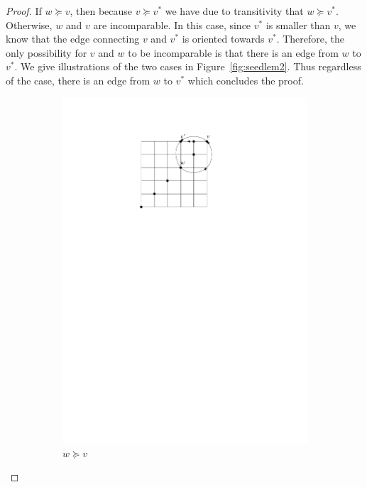 \documentclass[a4paper,10pt]{article}
\begin{document}
\begin{proof}
If $w \succeq v$, then because $v \succeq v^*$ we have due to transitivity that $w \succeq v^*$. 
  Otherwise, $w$ and $v$ are incomparable. In this case, since $v^*$ is smaller than $v$, we know that the edge connecting $v$ and $v^*$ is  oriented towards $v^*$. Therefore, the only possibility for $v$ and $w$ to be incomparable is that there is an edge from $w$ to $v^*$. We give illustrations of the two cases in Figure~\ref{fig:seedlem2}. Thus regardless of the case, there is an edge from $w$ to $v^*$ which concludes the proof.   
   \begin{figure}[htbp] 
       \centering
       \begin{subfigure}[b]{0.4\textwidth}
           \includegraphics[scale = 0.7]{seedlemma_fig2_cas1.pdf}
           \caption{$w \succeq v$}
       \end{subfigure}
       \qquad \qquad
       \begin{subfigure}[b]{0.4\textwidth}

\end{subfigure}
\end{figure}
\end{proof}
\end{document}
